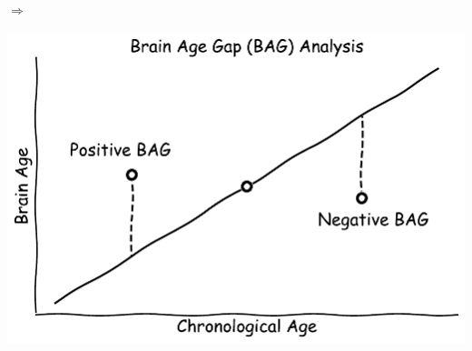 \documentclass[a0paper,landscape,fontscale=0.385]{baposter}
\newenvironment{Figure}
  {\par\medskip\noindent\minipage{\linewidth}}
  {\endminipage\par\medskip}
\begin{document}
\begin{poster}
{\begin{minipage}[b]{0.18\textwidth}
\begin{Figure}
    \end{Figure}
\end{minipage}
\begin{minipage}[b]{0.05\textwidth}
    \centering
    $\Longrightarrow$
    \vspace{5em}
\end{minipage}
\begin{minipage}[b]{0.35\textwidth}
    \begin{Figure}
        \centering
        \includegraphics[width=\linewidth]{bag_analysis_cartoon.pdf}
    \end{Figure}
\end{minipage}
\vspace{-1em}
}


\end{poster}
\end{document}

